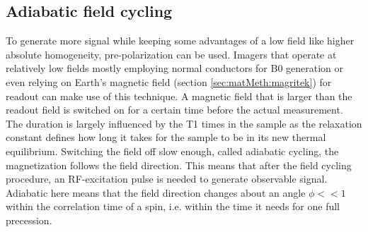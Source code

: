         \subsection{Adiabatic field cycling}
        To generate more signal while keeping some advantages of a low field like higher absolute homogeneity, pre-polarization can be used. Imagers that operate at relatively low fields mostly employing normal conductors for B0 generation or even relying on Earth's magnetic field (section \ref{sec:matMeth:magritek}) for readout can make use of this technique. A magnetic field that is larger than the readout field is switched on for a certain time before the actual measurement. The duration is largely influenced by the T1 times in the sample as the relaxation constant defines how long it takes for the sample to be in its new thermal equilibrium. Switching the field off slow enough, called adiabatic cycling, the magnetization follows the field direction. This means that after the field cycling procedure, an RF-excitation pulse is needed to generate observable signal.
        Adiabatic here means that the field direction changes about  an  angle $\phi<<1$  within the correlation time of a spin, i.e. within the time it needs for one full precession.
